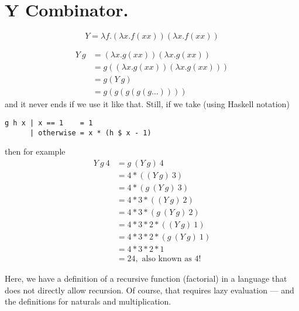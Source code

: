 
\section{ Y Combinator. }

$$
Y = λf.(λx.f(xx))(λx.f(xx))
$$

\begin{align*} 
Y\ g &= (λx.g(xx))(λx.g(xx)) \\
     &= g ((λx.g(xx)) (λx.g(xx))) \\
     &= g (Y\ g) \\
     &= g (g (g (g (g \ldots))))
\end{align*} 
and it never ends if we use it like that. Still, if we take (using Haskell notation)
\begin{verbatim}
g h x | x == 1    = 1
      | otherwise = x * (h $ x - 1)
\end{verbatim}
then for example 
\begin{align*} 
Y\ g\ 4 &= g\ (Y\ g)\ 4                \\
        &= 4 * ((Y\ g)\ 3)             \\
        &= 4 * (g\ (Y\ g)\ 3)          \\
        &= 4 * 3 * ((Y\ g)\ 2)         \\
        &= 4 * 3 * (g\ (Y\ g)\ 2)      \\
        &= 4 * 3 * 2 * ((Y\ g)\ 1)     \\
        &= 4 * 3 * 2 * (g\ (Y\ g)\ 1)  \\
        &= 4 * 3 * 2 * 1               \\
        &= 24,\text{ also known as } 4!
\end{align*} 

Here, we have a definition of a recursive function (factorial) in a language that does
not directly allow recursion. Of course, that requires lazy evaluation ---
and the definitions for naturals and multiplication.
